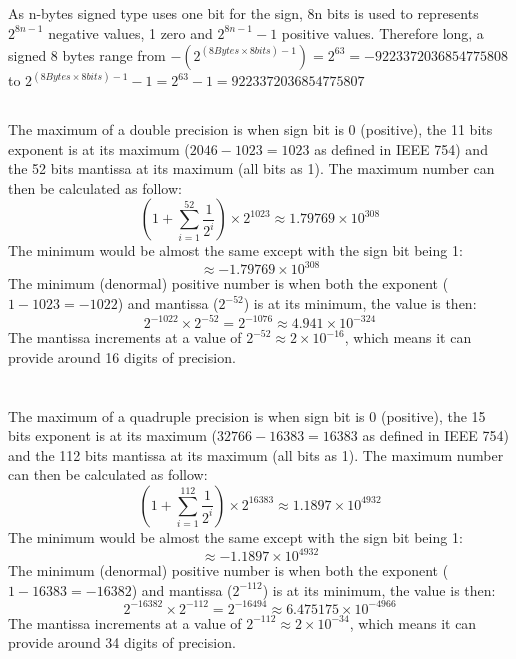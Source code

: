 \documentclass{article}
\begin{document}
\subsection{}
As n-bytes signed type uses one bit for the sign, 8n bits is used to represents $2^{8n-1}$ negative values, 1 zero and $2^{8n-1}-1$ positive values. Therefore long, a signed 8 bytes range from $-(2^{(8Bytes\times8bits)-1})=2^{63}=-9223372036854775808$ to $2^{(8Bytes\times8bits)-1}-1=2^{63}-1=9223372036854775807$
\subsection{}
The maximum of a double precision is when sign bit is 0 (positive), the 11 bits exponent is at its maximum ($2046-1023=1023$ as defined in IEEE 754) and the 52 bits mantissa at its maximum (all bits as 1). The maximum number can then be calculated as follow: $$(1+\sum_{i=1}^{52}\frac{1}{2^i})\times2^{1023}\approx1.79769\times10^{308}$$
The minimum would be almost the same except with the sign bit being 1:
$$\approx-1.79769\times10^{308}$$
The minimum (denormal) positive number is when both the exponent ($1-1023=-1022$) and mantissa ($2^{-52}$) is at its minimum, the value is then:
$$2^{-1022}\times2^{-52}=2^{-1076}\approx4.941\times10^{-324}$$
The mantissa increments at a value of $2^{-52}\approx2\times10^{-16}$, which means it can provide around 16 digits of precision.

\setcounter{section}{7}
\section{}
\subsection{}
The maximum of a quadruple precision is when sign bit is 0 (positive), the 15 bits exponent is at its maximum ($32766-16383=16383$ as defined in IEEE 754) and the 112 bits mantissa at its maximum (all bits as 1). The maximum number can then be calculated as follow: $$(1+\sum_{i=1}^{112}\frac{1}{2^i})\times2^{16383}\approx1.1897\times10^{4932}$$
The minimum would be almost the same except with the sign bit being 1:
$$\approx-1.1897\times10^{4932}$$
The minimum (denormal) positive number is when both the exponent ($1-16383=-16382$) and mantissa ($2^{-112}$) is at its minimum, the value is then:
$$2^{-16382}\times2^{-112}=2^{-16494}\approx6.475175\times10^{-4966}$$
The mantissa increments at a value of $2^{-112}\approx2\times10^{-34}$, which means it can provide around 34 digits of precision.
\end{document}
